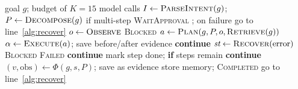 \begin{algorithm}[t]
\caption{Evidence-gated control loop (browser backend)}
\label{alg:loop}
\footnotesize
\begin{algorithmic}[1]
\Require goal $g$; budget of $K{=}15$ model calls
\State $I \gets \Call{ParseIntent}{g}$; $P \gets \Call{Decompose}{g}$ if multi-step
 \Return \textsc{WaitApproval} \EndIf
\State {}; on failure go to line~\ref{alg:recover}
\Loop
  \State $o \gets \Call{Observe}{}$ 
   \Return \textsc{Blocked}  \label{alg:beta}
  \EndIf
  \State $a \gets \Call{Plan}{g, P, o, \textsc{Retrieve}(g)}$ 
  \State $\alpha \gets \Call{Execute}{a}$; save before/after evidence
     \textbf{continue} \EndIf
    \State $\textit{st} \gets \Call{Recover}{\text{error}}$ \label{alg:recover}
     \Return \textsc{Blocked} \EndIf
     \Return \textsc{Failed} \EndIf
    \State \textbf{continue} 
  \EndIf
   mark step done; \textbf{if} steps remain \textbf{continue} \EndIf
    \State $(v, \text{obs}) \gets \Phi(g, s, P)$; save as evidence \label{alg:phi}
     store memory; \Return \textsc{Completed} \EndIf
  \EndIf
   go to line~\ref{alg:recover}  \EndIf
\EndLoop
\end{algorithmic}
\end{algorithm}
